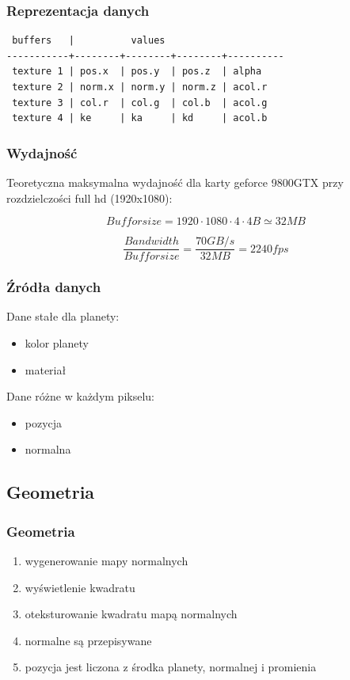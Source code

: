\documentclass{beamer}
\begin{document}
\begin{frame}[fragile]
	\frametitle{Reprezentacja danych}

	\begin{verbatim}
 buffers   |          values 
-----------+--------+--------+--------+----------
 texture 1 | pos.x  | pos.y  | pos.z  | alpha
 texture 2 | norm.x | norm.y | norm.z | acol.r
 texture 3 | col.r  | col.g  | col.b  | acol.g   
 texture 4 | ke     | ka     | kd     | acol.b
	\end{verbatim}
\end{frame}

\frame
{
	\frametitle{Wydajność}

	Teoretyczna maksymalna wydajność dla karty geforce 9800GTX przy rozdzielczości full hd (1920x1080):

	$$ Buffor size = 1920 \cdot 1080 \cdot 4 \cdot 4B \simeq 32MB $$

	\pause

	$$ \frac{Bandwidth}{Buffor size} = \frac{70GB/s}{32MB} = 2240 fps $$
}

\frame
{
	\frametitle{Źródła danych}

	Dane stałe dla planety:

	\begin{itemize}
	\item kolor planety
	\item materiał
	\end{itemize}

	Dane różne w każdym pikselu:

	\begin{itemize}
	\item pozycja 
	\item normalna
	\end{itemize}
}

\subsection{Geometria}\label{sub:geometria}

\frame
{
	\frametitle{Geometria}

	\begin{enumerate}
	\item wygenerowanie mapy normalnych
	\item wyświetlenie kwadratu
	\item oteksturowanie kwadratu mapą normalnych
	\item normalne są przepisywane
	\item pozycja jest liczona z środka planety, normalnej i promienia
	\end{enumerate}
}
\end{document}

